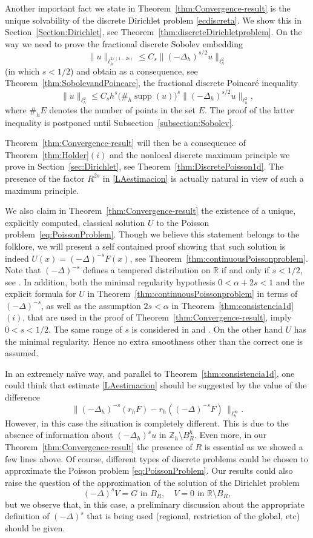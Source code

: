 \documentclass[a4paper,11pt,reqno]{amsart}
\newcommand{\R}{\mathbb{R}}
\newcommand{\Z}{\mathbb{Z}}
\newcommand{\supp}{\operatorname{supp}}
\theoremstyle{definition}
\numberwithin{equation}{section}
\begin{document}
Another important fact we state in Theorem~\ref{thm:Convergence-result}
is the unique solvability of the discrete Dirichlet problem \eqref{ecdiscreta}.
We show this in Section~\ref{Section:Dirichlet},
see Theorem~\ref{thm:discreteDirichletproblem}.
On the way we need to prove the fractional discrete Sobolev embedding
$$
\|u\|_{\ell_h^{2/(1-2s)}}\leq C_s\|(-\Delta_h)^{s/2}u\|_{\ell^2_h}
$$
(in which $s<1/2$)
and obtain as a consequence, see Theorem~\ref{thm:SobolevandPoincare}, the fractional discrete Poincar\'e
inequality
$$
\|u\|_{\ell_h^{2}}\leq C_sh^s\big(\#_h\supp(u)\big)^s\|(-\Delta_h)^{s/2}u\|_{\ell^2_h},
$$
where $\#_hE$ denotes the number of points in the set $E$.
The proof of the latter inequality
is postponed until Subsection~\ref{subsection:Sobolev}.

Theorem~\ref{thm:Convergence-result}
will then be a consequence of Theorem~\ref{thm:Holder}$(i)$ and
the nonlocal discrete maximum principle we prove in
Section~\ref{sec:Dirichlet}, see Theorem~\ref{thm:DiscretePoisson1d}.
The presence of the factor $R^{2s}$ in \eqref{LAestimacion} is actually
natural in view of such a maximum principle.

We also claim in Theorem~\ref{thm:Convergence-result}
the existence of a unique, explicitly computed, classical solution $U$ to the Poisson problem~\eqref{eq:PoissonProblem}.
Though we believe this statement belongs to the folklore, we will present a self contained
proof showing that such solution is indeed $U(x)=(-\Delta)^{-s}F(x)$,
see Theorem~\ref{thm:continuousPoissonproblem}. Note that $(-\Delta)^{-s}$
defines a tempered distribution on $\R$ if and only if $s<1/2$, see \cite{Silvestre-CPAM}.
In addition, both the minimal regularity hypothesis $0<\alpha+2s<1$ 
and the explicit formula for $U$ in Theorem~\ref{thm:continuousPoissonproblem}
in terms of $(-\Delta)^{-s}$, as well as
the assumption $2s<\alpha$ in Theorem~\ref{thm:consistencia1d}$(i)$, that are used in the proof of Theorem~\ref{thm:Convergence-result}, imply $0<s<1/2$. The same range of $s$
is considered in \cite{Savin-Valdinoci-1} and \cite{Silvestre-CPAM}. On the other hand $U$ has the minimal regularity.
Hence no extra smoothness other than the correct one is assumed.

In an extremely na\"ive way, and parallel to Theorem~\ref{thm:consistencia1d},  one could think that estimate \eqref{LAestimacion} should be suggested by the value of the difference 
$$
\|(-\Delta_h)^{-s}(r_hF)-r_h((-\Delta)^{-s}F)\, \|_{\ell_h^\infty}. 
$$ 
However, in this case the situation is completely different. This is due to the absence of information about $(-\Delta_h)^s u $ in $\Z_h\setminus B_R^h$. Even more, in our Theorem~\ref{thm:Convergence-result} the presence of $R$
is essential as we showed a few lines above. Of course, different types of discrete problems could be chosen to approximate the Poisson problem \eqref{eq:PoissonProblem}. Our results could also raise the question of the approximation of the solution of the Dirichlet problem
$$
(-\Delta)^sV = G   \text{ in } B_R,  \quad  V=0 \text{ in }  \R \setminus  B_R,
$$
but we observe that, in this case, a preliminary discussion about the appropriate
definition of $(-\Delta)^s$ that is being used (regional, restriction of the global, etc) should be given.
\end{document}

